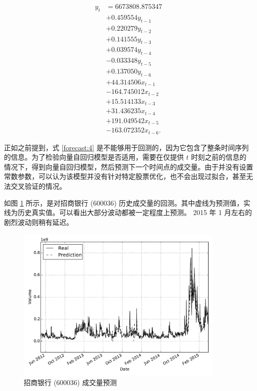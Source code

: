 \begin{equation}
  \label{forecast:4}
  \begin{split}
    y_{t}&=6673808.875347 \\
    &+0.459554y_{t-1} \\
    &+0.220279y_{t-2} \\
    &+0.141555y_{t-3} \\
    &+0.039574y_{t-4} \\
    &-0.033348y_{t-5} \\
    &+0.137050y_{t-6} \\
    &+44.314506x_{t-1} \\
    &-164.745012x_{t-2} \\
    &+15.514133x_{t-3} \\
    &+31.436235x_{t-4} \\
    &+191.049542x_{t-5} \\
    &-163.072352x_{t-6}.
  \end{split}
\end{equation}

正如之前提到，式 \ref{forecast:4} 是不能够用于回测的，因为它包含了整条时间序列的信息。为了检验向量自回归模型是否适用，需要在仅提供 $t$ 时刻之前的信息的情况下，得到向量自回归模型，然后预测下一个时间点的成交量。由于并没有设置常数参数，可以认为该模型并没有针对特定股票优化，也不会出现过拟合，甚至无法交叉验证的情况。

如图 \ref{forecast:5} 所示，是对招商银行 (600036) 历史成交量的回测。其中虚线为预测值，实线为历史真实值。可以看出大部分波动都被一定程度上预测。 2015 年 1 月左右的剧烈波动则稍有延迟。

\begin{figure}
  \centering
  \includegraphics[width=0.9\textwidth]{plots/click_count_forecast_volume.pdf}
  \caption{招商银行 (600036) 成交量预测}
  \label{forecast:5}
\end{figure}

